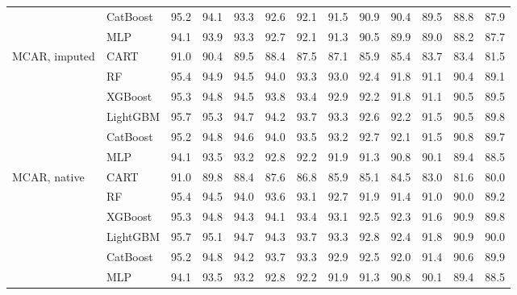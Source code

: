 \begin{table}[p]
\begin{tabular}{@{}llrrrrrrrrrrr@{}}
 & CatBoost & 95.2 & 94.1 & 93.3 & 92.6 & 92.1 & 91.5 & 90.9 & 90.4 & 89.5 & 88.8 & 87.9 \\
 & MLP & 94.1 & 93.9 & 93.3 & 92.7 & 92.1 & 91.3 & 90.5 & 89.9 & 89.0 & 88.2 & 87.7 \\
\midrule
MCAR, imputed & CART & 91.0 & 90.4 & 89.5 & 88.4 & 87.5 & 87.1 & 85.9 & 85.4 & 83.7 & 83.4 & 81.5 \\
 & RF & 95.4 & 94.9 & 94.5 & 94.0 & 93.3 & 93.0 & 92.4 & 91.8 & 91.1 & 90.4 & 89.1 \\
 & XGBoost & 95.3 & 94.8 & 94.5 & 93.8 & 93.4 & 92.9 & 92.2 & 91.8 & 91.1 & 90.5 & 89.5 \\
 & LightGBM & 95.7 & 95.3 & 94.7 & 94.2 & 93.7 & 93.3 & 92.6 & 92.2 & 91.5 & 90.5 & 89.8 \\
 & CatBoost & 95.2 & 94.8 & 94.6 & 94.0 & 93.5 & 93.2 & 92.7 & 92.1 & 91.5 & 90.8 & 89.7 \\
 & MLP & 94.1 & 93.5 & 93.2 & 92.8 & 92.2 & 91.9 & 91.3 & 90.8 & 90.1 & 89.4 & 88.5 \\
\midrule
MCAR, native & CART & 91.0 & 89.8 & 88.4 & 87.6 & 86.8 & 85.9 & 85.1 & 84.5 & 83.0 & 81.6 & 80.0 \\
 & RF & 95.4 & 94.5 & 94.0 & 93.6 & 93.1 & 92.7 & 91.9 & 91.4 & 91.0 & 90.0 & 89.2 \\
 & XGBoost & 95.3 & 94.8 & 94.3 & 94.1 & 93.4 & 93.1 & 92.5 & 92.3 & 91.6 & 90.9 & 89.8 \\
 & LightGBM & 95.7 & 95.1 & 94.7 & 94.3 & 93.7 & 93.3 & 92.8 & 92.4 & 91.8 & 90.9 & 90.0 \\
 & CatBoost & 95.2 & 94.8 & 94.2 & 93.7 & 93.3 & 92.9 & 92.5 & 92.0 & 91.4 & 90.6 & 89.9 \\
 & MLP & 94.1 & 93.5 & 93.2 & 92.8 & 92.2 & 91.9 & 91.3 & 90.8 & 90.1 & 89.4 & 88.5 \\
\bottomrule
\end{tabular}
\end{table}

